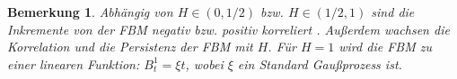 \documentclass[12pt,titlepage,headsepline]{article}
\newtheorem*{theorem-non}{Theorem}
\newtheorem*{corollary-non}{Korollar}
\newtheorem*{beweis-non}{Beweis}
\newtheorem*{bemerkung*}{Bemerkung}
\begin{document}
      \begin{bemerkung*}
        \textup{
        Abhängig von $H \in (0,1/2)$ bzw. $H \in (1/2,1)$ sind die Inkremente von der FBM negativ bzw. positiv korreliert \cite{grimmett2020probability}. Außerdem wachsen die Korrelation und die Persistenz der FBM mit $H$. Für $H=1$ wird die FBM zu einer linearen Funktion: $B_t^1=\xi t$, wobei $\xi$ ein Standard Gaußprozess ist.
        }
      \end{bemerkung*}
\end{document}
